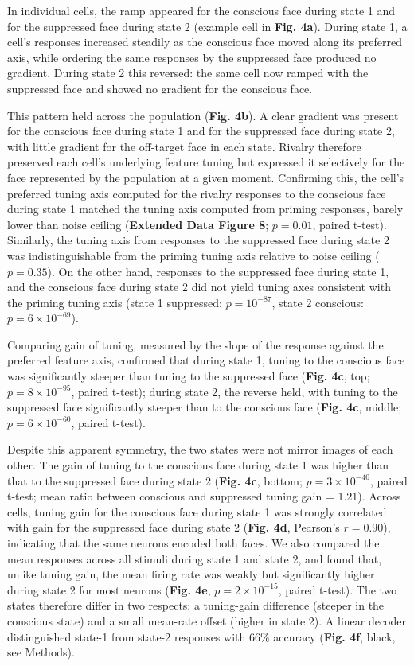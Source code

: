 \documentclass{article}
\begin{document}
In individual cells, the ramp appeared for the conscious face during state 1 and for the suppressed face during state 2 (example cell in \textbf{Fig. 4a}). During state 1, a cell's responses increased steadily as the conscious face moved along its preferred axis, while ordering the same responses by the suppressed face produced no gradient. During state 2 this reversed: the same cell now ramped with the suppressed face and showed no gradient for the conscious face.

This pattern held across the population (\textbf{Fig. 4b}). A clear gradient was present for the conscious face during state 1 and for the suppressed face during state 2, with little gradient for the off-target face in each state. Rivalry therefore preserved each cell's underlying feature tuning but expressed it selectively for the face represented by the population at a given moment. Confirming this, the cell's preferred tuning axis computed for the rivalry responses to the conscious face during state 1 matched the tuning axis computed from priming responses, barely lower than noise ceiling (\textbf{Extended Data Figure 8}; $p = 0.01$, paired t-test). Similarly, the tuning axis from responses to the suppressed face during state 2 was indistinguishable from the priming tuning axis relative to noise ceiling ($p = 0.35$). On the other hand, responses to the suppressed face during state 1, and the conscious face during state 2 did not yield tuning axes consistent with the priming tuning axis (state 1 suppressed: $p = 10^{-87}$, state 2 conscious: $p = 6 \times 10^{-69}$).

Comparing gain of tuning, measured by the slope of the response against the preferred feature axis, confirmed that during state 1, tuning to the conscious face was significantly steeper than tuning to the suppressed face (\textbf{Fig. 4c}, top; $p = 8 \times 10^{-95}$, paired t-test); during state 2, the reverse held, with tuning to the suppressed face significantly steeper than to the conscious face (\textbf{Fig. 4c}, middle; $p = 6 \times 10^{-60}$, paired t-test).

Despite this apparent symmetry, the two states were not mirror images of each other. The gain of tuning to the conscious face during state 1 was higher than that to the suppressed face during state 2 (\textbf{Fig. 4c}, bottom; $p = 3 \times 10^{-40}$, paired t-test; mean ratio between conscious and suppressed tuning gain = 1.21). Across cells, tuning gain for the conscious face during state 1 was strongly correlated with gain for the suppressed face during state 2 (\textbf{Fig. 4d}, Pearson's $r = 0.90$), indicating that the same neurons encoded both faces. We also compared the mean responses across all stimuli during state 1 and state 2, and found that, unlike tuning gain, the mean firing rate was weakly but significantly higher during state 2 for most neurons (\textbf{Fig. 4e}, $p = 2 \times 10^{-15}$, paired t-test). The two states therefore differ in two respects: a tuning-gain difference (steeper in the conscious state) and a small mean-rate offset (higher in state 2). A linear decoder distinguished state-1 from state-2 responses with 66\% accuracy (\textbf{Fig. 4f}, black, see Methods).
\end{document}
